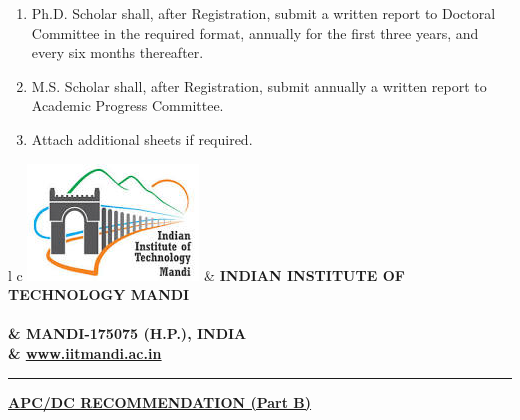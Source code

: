 \documentclass[12 pt, a4paper]{article}
\newcommand{\HRule}{\rule{\linewidth}{1mm}}
\begin{document}
\begin{enumerate}[label=(\roman*)]
	\item Ph.D. Scholar shall, after Registration, submit a written report to Doctoral Committee in the required
	format, annually for the first three years, and every six months thereafter.
	\item M.S. Scholar shall, after Registration, submit annually a written report to Academic Progress Committee.
	\item Attach additional sheets if required.
\end{enumerate}



\clearpage
{}
\pagestyle{empty}
\vskip 0.2cm
\begin{tabular}{l c}
	{\includegraphics[scale=0.50]{logo.jpg}}                              &
	\large\bf{INDIAN INSTITUTE OF TECHNOLOGY MANDI} \\
	\\ & \large\bf{MANDI-175075 (H.P.), INDIA} \\ & \underline{\href{www.iitmandi.ac.in}{www.iitmandi.ac.in}}
\end{tabular}
\vskip 0.7cm
{\raggedleft{}\HRule}

\begin{center}
	\large\bf{\underline{APC/DC RECOMMENDATION (Part B)}} 
\end{center}
\end{document}
